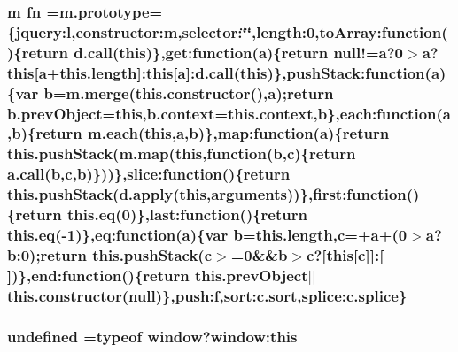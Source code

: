 \subsubsection[{fn}]{\setlength{\rightskip}{0pt plus 5cm}m fn =m.\+prototype=\{jquery\+:l,constructor\+:m,selector\+:\char`\"{}\char`\"{},length\+:0,to\+Array\+:function()\{return d.\+call(this)\},get\+:function({\bf a})\{return null!={\bf a}?0$>${\bf a}?this\mbox{[}{\bf a}+this.\+length\mbox{]}\+:this\mbox{[}{\bf a}\mbox{]}\+:d.\+call(this)\},push\+Stack\+:function({\bf a})\{var {\bf b}=m.\+merge(this.\+constructor(),{\bf a});return b.\+prev\+Object=this,b.\+context=this.\+context,{\bf b}\},each\+:function({\bf a},{\bf b})\{return {\bf m.\+each}(this,{\bf a},{\bf b})\},map\+:function({\bf a})\{return this.\+push\+Stack(m.\+map(this,function({\bf b},{\bf c})\{return a.\+call({\bf b},{\bf c},{\bf b})\}))\},slice\+:function()\{return this.\+push\+Stack(d.\+apply(this,arguments))\},first\+:function()\{return this.\+eq(0)\},last\+:function()\{return this.\+eq(-\/1)\},eq\+:function({\bf a})\{var {\bf b}=this.\+length,{\bf c}=+{\bf a}+(0$>${\bf a}?b\+:0);return this.\+push\+Stack({\bf c}$>$=0\&\&{\bf b}$>${\bf c}?\mbox{[}this\mbox{[}{\bf c}\mbox{]}\mbox{]}\+:\mbox{[}$\,$\mbox{]})\},end\+:function()\{return this.\+prev\+Object$\vert$$\vert$this.\+constructor(null)\},push\+:f,sort\+:c.\+sort,splice\+:c.\+splice\}}\label{assets_2js_2jquery-1_811_82_8min_8js_ab2836ee14921cbd6e34ea91a9a99ad66}
\hypertarget{assets_2js_2jquery-1_811_82_8min_8js_ae21cc36bf0d65014c717a481a3f8a468}{}
\subsubsection[{undefined}]{\setlength{\rightskip}{0pt plus 5cm}undefined =typeof window?window\+:this}\label{assets_2js_2jquery-1_811_82_8min_8js_ae21cc36bf0d65014c717a481a3f8a468}
